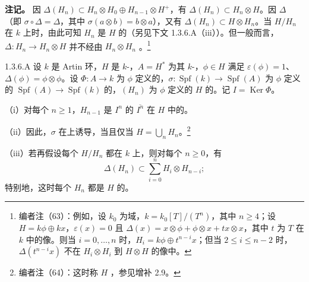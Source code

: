 \textbf{注记。} 因 $\Delta(H_n)\subset H_n\otimes H_0\oplus H_{n-1}\otimes H^+$，有 $\Delta(H_n)\subset H_n\otimes H$。因 $\Delta$ （即 $\sigma\circ\Delta=\Delta$，其中 $\sigma(a\otimes b)=b\otimes a$），又有 $\Delta(H_n)\subset H\otimes H_n$。当 $H/H_n$ 在 $k$ 上时，由此可知 $H_n$ 是 $H$ 的（另见下文 1.3.6.A（iii））。但一般而言，$\Delta:H_n\to H_n\otimes H$ 并不经由 $H_n\otimes H_n$ 。\footnote{编者注（63）：例如，设 $k_0$ 为域，$k=k_0[T]/(T^n)$，其中 $n\geq4$；设 $H=k\phi\oplus kx$，$\varepsilon(x)=0$ 且 $\Delta(x)=x\otimes\phi+\phi\otimes x+tx\otimes x$，其中 $t$ 为 $T$ 在 $k$ 中的像。则当 $i=0,\ldots,n$ 时，$H_i=k\phi\oplus t^{n-i}x$；但当 $2\leq i\leq n-2$ 时，$\Delta(t^{n-i}x)$ 不在 $H_i\otimes H_i$ 到 $H\otimes H$ 的像中。}
\begin{SGAresult}{}{1.3.6.A}
设 $k$ 是 Artin 环，$H$ 是 $k$-，$A=H^*$ 为其 $k$-，$\phi\in H$ 满足 $\varepsilon(\phi)=1$、$\Delta(\phi)=\phi\otimes\phi$。设 $\Phi:A\to k$ 为 $\phi$ 定义的，$\sigma:\operatorname{Spf}(k)\to\operatorname{Spf}(A)$ 为 $\phi$ 定义的 $\operatorname{Spf}(A)\to\operatorname{Spf}(k)$ 的，$(H_n)$ 为 $\phi$ 定义的 $H$ 的。记 $I=\operatorname{Ker}\Phi$。

（i）对每个 $n\geq1$，$H_{n-1}$ 是 $I^n$ 的 $\overline{I^n}$ 在 $H$ 中的。

（ii）因此，$\sigma$ 在上诱导，当且仅当 $H=\bigcup_nH_n$。\footnote{编者注（64）：这时称 $H$ ，参见增补 2.9。}

（iii）若再假设每个 $H/H_n$ 都在 $k$ 上，则对每个 $n\geq0$，有
\[
 \Delta(H_n)\subset\sum_{i=0}^nH_i\otimes H_{n-i};\tag{$*$}
\]
特别地，这时每个 $H_n$ 都是 $H$ 的。
\end{SGAresult}
